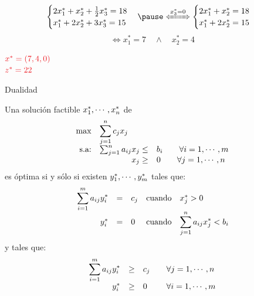 \documentclass[10pt, aspectratio=169,usenames,dvipsnames]{beamer}
\begin{document}
\begin{frame}{}
    $$
    \begin{cases}
    2x_1^*+x_2^*+\frac{1}{2}x_3^*=18 \\ x_1^*+2x_2^*+3x_3^*=15
    \end{cases}
    \pause
    \xLeftrightarrow[]{x_3^*=0}
    \begin{cases}
    2x_1^*+x_2^*=18 \\ x_1^*+2x_2^*=15
    \end{cases}
    $$
    \pause
    $$\iff x_1^*=7 \quad \wedge \quad x_2^*=4$$
    \begin{center}
    $\color{Red}x^*=(7,4,0)$\\
    $\color{Red}z^*=22$ 
    \end{center}
\end{frame}

\begin{frame}{Dualidad}\footnotesize
    \begin{tcolorbox}[title=Teorema]
    Una solución factible $x^{\ast}_1, \cdots, x^{\ast}_n$ de 
    \[\begin{array}{rrl}
        \max & \multicolumn{2}{l}{\displaystyle\sum_{j=1}^n c_jx_j}  \\
        \text{s.a:} & \sum_{j=1}^n a_{ij}x_j \leq & b_i \qquad \forall i=1,\cdots,m \\
         & x_j \geq & 0 \qquad \forall j=1,\cdots, n
    \end{array}\]
    es óptima si y sólo si existen $y^{\ast}_1,\cdots,y^{\ast}_m$ tales que:
    \[\begin{array}{rclcl}
        \displaystyle \sum_{i=1}^m a_{ij}y^{\ast}_i & = & c_j & \text{cuando} & x^{\ast}_j>0  \\
        y^{\ast}_i & = & 0 & \text{cuando} & \displaystyle\sum_{j=1}^n a_{ij}x^{\ast}_j < b_i  
    \end{array}
    \]
    y tales que:
    \[\begin{array}{rcll}
        \displaystyle\sum_{i=1}^m a_{ij}y^{\ast}_i & \geq & c_j & \quad \forall j=1,\cdots,n  \\
        y^{\ast}_i & \geq & 0 & \quad \forall i=1,\cdots,m 
    \end{array}
    \]
    \end{tcolorbox}
\end{frame}
\end{document}
